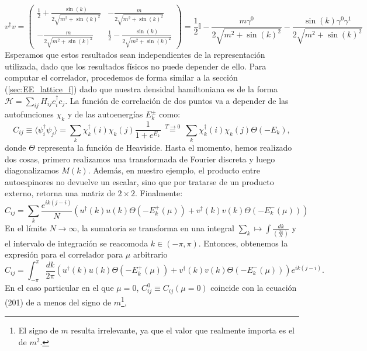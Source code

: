 \begin{equation}
v^{\dag}v=\begin{pmatrix}
\frac{1}{2}+\frac{\sin(k)}{2\sqrt{m^2+\sin(k)^2}} & -\frac{m}{2\sqrt{m^2+\sin(k)^2}} \\ -\frac{m}{2\sqrt{m^2+\sin(k)^2}} & \frac{1}{2}-\frac{\sin(k)}{2\sqrt{m^2+\sin(k)^2}}
\end{pmatrix} = \frac{1}{2}\mathbb{I}-\frac{m\gamma^0}{2\sqrt{m^2+\sin(k)^2}}-\frac{\sin(k)\gamma^0\gamma^1}{2\sqrt{m^2+\sin(k)^2}}
\end{equation}
Esperamos que estos resultados sean independientes de la representación utilizada, dado que los resultados físicos no puede depender de ello. Para computar el correlador, procedemos de forma similar a la sección (\ref{sec:EE_lattice_f}) dado que nuestra densidad hamiltoniana es de la forma $\mathcal{H}=\sum_{ij}H_{ij}c^{\dag}_ic_j$. La función de correlación de dos puntos va a depender de las autofunciones $\chi_k$ y de las autoenergías $E_k^{\pm}$ como:
\begin{equation}
C_{ij}\equiv \langle \psi^{\dag}_i \psi_j\rangle={\sum_k \chi^{\dag}_k(i)\chi_k(j)\frac{1}{1+e^{ E_k}}}\:\stackrel{T\rightarrow 0}{=}\:\sum_k \chi^{\dag}_k(i)\chi_k(j)\Theta(-E_k),
\end{equation}
donde $\Theta$ representa la función de Heaviside. Hasta el momento, hemos realizado dos cosas, primero realizamos una transformada de Fourier discreta y luego diagonalizamos $M(k)$. Además, en nuestro ejemplo, el producto entre autoespinores no devuelve un escalar, sino que por tratarse de un producto externo, retorna una matriz de $2\times 2$. Finalmente:
\begin{equation}
C_{ij}=\sum_k \frac{e^{ik(j-i)}}{N}\left(u^{\dag}(k)u(k)\Theta(-E_k^+(\mu))+v^{\dag}(k)v(k)\Theta(-E_k^-(\mu))\right)
\end{equation}
En el límite $N\rightarrow \infty$, la sumatoria se transforma en una integral $\sum_{k} \mapsto \int \frac{dk}{(\frac{2\pi}{N})}$ y el intervalo de integración se reacomoda $k \in (-\pi,\pi)$. Entonces, obtenemos la expresión para el correlador para $\mu$ arbitrario 
\begin{equation}
C_{ij}=\int_{-\pi}^{\pi} \frac{dk}{2\pi}  \left(u^{\dag}(k)u(k)\Theta(-E_k^+(\mu))+v^{\dag}(k)v(k)\Theta(-E_k^-(\mu))\right) e^{ik(j-i)}. 
\label{eq:corr_mu}
\end{equation}
En el caso particular en el que $\mu=0$, $C_{ij}^0\equiv C_{ij}(\mu=0)$ coincide con la ecuación (201) de \cite{Casini:2009sr} a menos del signo de $m$\footnote{El signo de $m$ resulta irrelevante, ya que el valor que realmente importa es el de $m^2$.},
